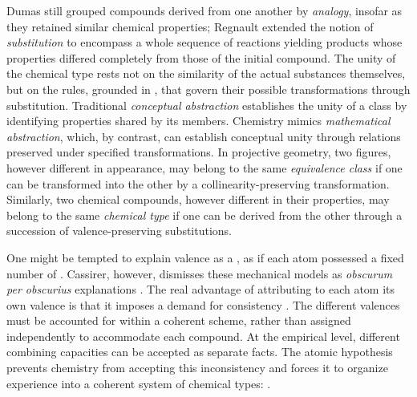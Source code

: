 \documentclass[submitted,12pt]{article}
\renewcommand{\SF}[2]{\citep[#1/#2]{Cassirer1910}}
\begin{document}
%
Dumas still grouped compounds derived from one another by \emph{analogy}, insofar as they retained similar chemical properties; Regnault extended the notion of \emph{substitution} to encompass a whole sequence of reactions yielding products whose properties differed completely from those of the initial compound. The unity of the chemical type rests not on the similarity of the actual substances themselves, but on the rules, grounded in , that govern their possible transformations through substitution. Traditional \emph{conceptual abstraction} establishes the unity of a class by identifying properties shared by its members. Chemistry mimics \emph{mathematical abstraction}, which, by contrast, can establish conceptual unity through relations preserved under specified transformations. In projective geometry, two figures, however different in appearance, may belong to the same \emph{equivalence class} if one can be transformed into the other by a collinearity-preserving transformation. Similarly, two chemical compounds, however different in their properties, may belong to the same \emph{chemical type} if one can be derived from the other through a succession of valence-preserving substitutions.

One might be tempted to explain valence as a , as if each atom possessed a fixed number of  \SF{284}{214}. Cassirer, however, dismisses these mechanical models as \textit{obscurum per obscurius} explanations \SF{285}{214}. The real advantage of attributing to each atom its own valence is that it imposes a demand for consistency \SF{283}{213}. The different valences must be accounted for within a coherent scheme, rather than assigned independently to accommodate each compound. At the empirical level, different combining capacities can be accepted as separate facts. The atomic hypothesis prevents chemistry from accepting this inconsistency and forces it to organize experience into a coherent system of chemical types:  \SF{285}{214}.
\end{document}
